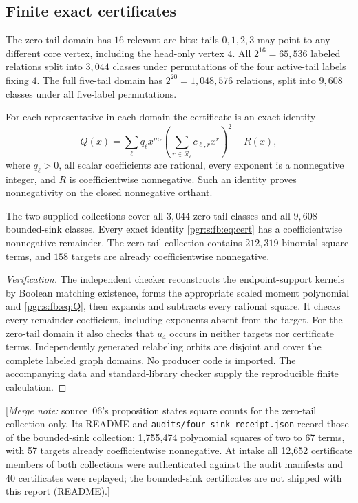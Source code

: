 \documentclass[11pt]{article}
\numberwithin{equation}{section}
\theoremstyle{definition}\newtheorem{definition}[theorem]{Definition}\newtheorem{remark}[theorem]{Remark}
\newcommand{\mnote}[1]{[\textit{Merge note:} #1]}
\begin{document}
\subsection{Finite exact certificates}
The zero-tail domain has $16$ relevant arc bits: tails $0,1,2,3$ may point to any different core vertex, including the head-only vertex $4$. All $2^{16}=65,536$ labeled relations split into $3,044$ classes under permutations of the four active-tail labels fixing $4$. The full five-tail domain has $2^{20}=1,048,576$ relations, split into $9,608$ classes under all five-label permutations.

For each representative in each domain the certificate is an exact identity
\begin{equation}\label{pgr:s:fb:eq:cert}
 Q(x)=\sum_\ell q_\ell x^{m_\ell}
          \left(\sum_{r\in\mathcal R_\ell}c_{\ell,r}x^r\right)^2+R(x),
\end{equation}
where $q_\ell>0$, all scalar coefficients are rational, every exponent is a nonnegative integer, and $R$ is coefficientwise nonnegative. Such an identity proves nonnegativity on the closed nonnegative orthant.

\begin{proposition}\label{pgr:s:fb:prop:cert}
The two supplied collections cover all $3,044$ zero-tail classes and all $9,608$ bounded-sink classes. Every exact identity \eqref{pgr:s:fb:eq:cert} has a coefficientwise nonnegative remainder. The zero-tail collection contains $212,319$ binomial-square terms, and $158$ targets are already coefficientwise nonnegative.
\end{proposition}
\begin{proof}[Verification]
The independent checker reconstructs the endpoint-support kernels by Boolean matching existence, forms the appropriate scaled moment polynomial and \eqref{pgr:s:fb:eq:Q}, then expands and subtracts every rational square. It checks every remainder coefficient, including exponents absent from the target. For the zero-tail domain it also checks that $u_4$ occurs in neither targets nor certificate terms. Independently generated relabeling orbits are disjoint and cover the complete labeled graph domains. No producer code is imported. The accompanying data and standard-library checker supply the reproducible finite calculation.
\end{proof}


\mnote{source~06's proposition states square counts for the zero-tail
collection only. Its README and \texttt{audits/four-sink-receipt.json}
record those of the bounded-sink collection: 1,755,474 polynomial squares
of two to 67 terms, with 57 targets already coefficientwise nonnegative.
At intake all 12,652 certificate members of both collections were
authenticated against the audit manifests and 40 certificates were
replayed; the bounded-sink certificates are not shipped with this report
(README).}
\end{document}
